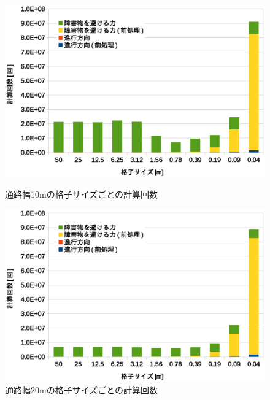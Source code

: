 \begin{figure}[tb]
	\begin{minipage}[b]{0.48\columnwidth}
		\begin{center}
		\includegraphics[width=\columnwidth]{figure/5_result_10m_times.eps}
		\caption{通路幅10mの格子サイズごとの計算回数}
		\label{fig:result_10m_times}
		\end{center}
	\end{minipage}
	\hspace{0.04\columnwidth}
	\begin{minipage}[b]{0.48\columnwidth}
		\begin{center}
		\includegraphics[width=\columnwidth]{figure/5_result_20m_times.eps}
		\caption{通路幅20mの格子サイズごとの計算回数}
		\label{fig:result_20m_times}
		\end{center}
	\end{minipage}
\end{figure}

